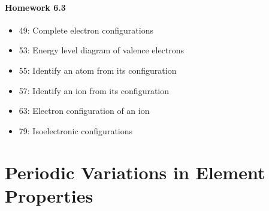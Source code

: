 \documentclass[12pt, openany, letterpaper]{memoir}
\begin{document}
\paragraph*{Homework 6.3}
\begin{itemize}
  \item 49: Complete electron configurations
  \item 53: Energy level diagram of valence electrons
  \item 55: Identify an atom from its configuration
  \item 57: Identify an ion from its configuration
  \item 63: Electron configuration of an ion
  \item 79: Isoelectronic configurations
\end{itemize}

\section{Periodic Variations in Element Properties}
\end{document}
